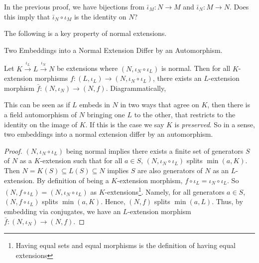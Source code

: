 \documentclass[../book.tex]{subfiles}
\begin{document}
\begin{ex}
    In the previous proof, we have bijections from 
    $\bar\iota_M : N \to M$ and $\bar\iota_N : M \to N$. 
    Does this imply that $\bar\iota_N\circ\iota_M$ is the identity on $N$?
\end{ex}
\begin{rmk}
    The following is a key property of normal extensions.
\end{rmk}
\begin{thm} Two Embeddings into a Normal Extension Differ by an Automorphism.
    
    Let $K \overset{\iota_L}{\to} L \overset{\iota_N}{\to} N$ be extensions
    where $(N,\iota_N\circ\iota_L)$ is normal. 
    Then for all $K$-extension morphisms 
    $f : (L,\iota_L) \to (N,\iota_N\circ\iota_L)$,
    there exists an $L$-extension morphism $\bar{f} : (N,\iota_N) \to (N,f)$.
    Diagrammatically, 
    \begin{figure}[H]
        \centering
    \end{figure}
    This can be seen as if $L$ embeds in $N$ in two ways that agree on $K$, 
    then there is a field automorphism of $N$ bringing one $L$ to the other, 
    that restricts to the identity on the image of $K$.
    If this is the case we say $K$ is \emph{preserved}. 
    So in a sense, two embeddings into a normal extension
    differ by an automorphism. 
\end{thm}
\begin{proof}
    $(N,\iota_N\circ\iota_L)$ being normal implies
    there exists a finite set of generators $S$ of $N$ as a $K$-extension
    such that for all $a \in S$, $(N,\iota_N\circ\iota_L)$ splits $\min(a,K)$. 
    Then $N = K(S) \subseteq L(S) \subseteq N$
    implies $S$ are also generators of $N$ as an $L$-extension.
    By definition of being a $K$-extension morphism, 
    $f\circ\iota_L = \iota_N\circ\iota_L$. 
    So $(N,f\circ\iota_L) = (N,\iota_N\circ\iota_L)$ as $K$-extensions\footnote{
    Having equal sets and equal morphisms is the definition 
    of having equal extensions}. 
    Namely, for all generators $a \in S$, $(N,f\circ\iota_L)$ splits $\min(a,K)$.
    Hence, $(N,f)$ splits $\min(a,L)$.
    Thus, by embedding via conjugates, we have an $L$-extension morphism
    $\bar{f} : (N,\iota_N) \to (N,f)$. 
\end{proof}
\end{document}
